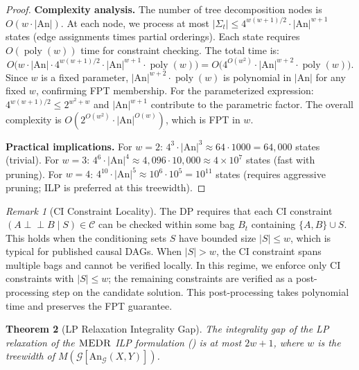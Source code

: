 \documentclass[11pt,a4paper]{article}
\newtheorem{theorem}{Theorem}[section]
\theoremstyle{definition}
\theoremstyle{remark}
\newtheorem{remark}[theorem]{Remark}
\newcommand{\CI}{\perp\!\!\!\perp}
\newcommand{\DAG}{\mathcal{G}}
\newcommand{\An}{\mathrm{An}}
\newcommand{\MEDR}{\textsc{MEDR}}
\DeclareMathOperator{\poly}{poly}
\begin{document}
\begin{proof}
\medskip
\noindent\textbf{Complexity analysis.}
The number of tree decomposition nodes is $O(w \cdot |\An|)$. At each node, we process
at most $|\Sigma_t| \leq 4^{w(w+1)/2} \cdot |\An|^{w+1}$ states (edge assignments
times partial orderings). Each state requires $O(\poly(w))$ time for constraint
checking. The total time is:
\[
  O\bigl(w \cdot |\An| \cdot 4^{w(w+1)/2} \cdot |\An|^{w+1} \cdot \poly(w)\bigr)
  = O\bigl(4^{O(w^2)} \cdot |\An|^{w+2} \cdot \poly(w)\bigr).
\]
Since $w$ is a fixed parameter, $|\An|^{w+2} \cdot \poly(w)$ is polynomial in $|\An|$
for any fixed $w$, confirming FPT membership. For the parameterized expression:
$4^{w(w+1)/2} \leq 2^{w^2 + w}$ and $|\An|^{w+1}$ contribute to the parametric factor.
The overall complexity is $O(2^{O(w^2)} \cdot |\An|^{O(w)})$, which is FPT in $w$.

\medskip
\noindent\textbf{Practical implications.}
For $w = 2$: $4^{3} \cdot |\An|^3 \approx 64 \cdot 1000 = 64{,}000$ states (trivial).
For $w = 3$: $4^{6} \cdot |\An|^4 \approx 4{,}096 \cdot 10{,}000 \approx 4 \times 10^7$ states (fast with pruning).
For $w = 4$: $4^{10} \cdot |\An|^5 \approx 10^6 \cdot 10^5 = 10^{11}$ states (requires aggressive pruning;
  ILP is preferred at this treewidth).
\end{proof}

\begin{remark}[CI Constraint Locality]\label{rem:ci_locality}
The DP requires that each CI constraint $(A \CI B \mid S) \in \mathcal{C}$ can be
checked within some bag $B_t$ containing $\{A, B\} \cup S$. This holds when the
conditioning sets $S$ have bounded size $|S| \leq w$, which is typical for published
causal DAGs. When $|S| > w$, the CI constraint spans multiple bags and cannot be
verified locally. In this regime, we enforce only CI constraints with $|S| \leq w$;
the remaining constraints are verified as a post-processing step on the candidate
solution. This post-processing takes polynomial time and preserves the FPT guarantee.
\end{remark}


\begin{theorem}[LP Relaxation Integrality Gap]\label{thm:lp_gap}
The integrality gap of the LP relaxation of the $\MEDR$ ILP formulation
() is at most $2w + 1$, where $w$ is the treewidth of
$M(\DAG[\An_\DAG(X,Y)])$.
\end{theorem}
\end{document}
